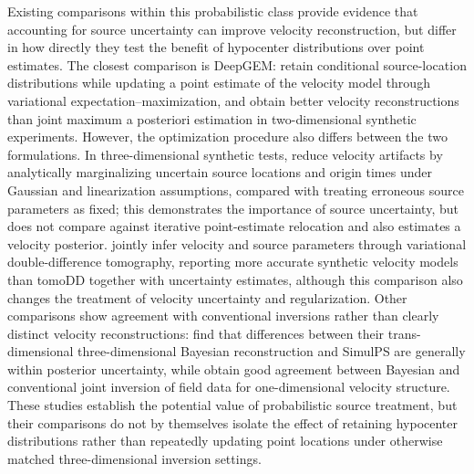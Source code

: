 \documentclass[12pt, a4paper]{article}
\begin{document}
Existing comparisons within this probabilistic class provide evidence that accounting for source uncertainty can improve velocity reconstruction, but differ in how directly they test the benefit of hypocenter distributions over point estimates. The closest comparison is DeepGEM: \textcite{gao2021} retain conditional source-location distributions while updating a point estimate of the velocity model through variational expectation--maximization, and obtain better velocity reconstructions than joint maximum a posteriori estimation in two-dimensional synthetic experiments. However, the optimization procedure also differs between the two formulations. In three-dimensional synthetic tests, \textcite{agata2026} reduce velocity artifacts by analytically marginalizing uncertain source locations and origin times under Gaussian and linearization assumptions, compared with treating erroneous source parameters as fixed; this demonstrates the importance of source uncertainty, but does not compare against iterative point-estimate relocation and also estimates a velocity posterior. \textcite{yang2025} jointly infer velocity and source parameters through variational double-difference tomography, reporting more accurate synthetic velocity models than tomoDD together with uncertainty estimates, although this comparison also changes the treatment of velocity uncertainty and regularization. Other comparisons show agreement with conventional inversions rather than clearly distinct velocity reconstructions: \textcite{pianaagostinetti2015} find that differences between their trans-dimensional three-dimensional Bayesian reconstruction and SimulPS are generally within posterior uncertainty, while \textcite{ryberg2019} obtain good agreement between Bayesian and conventional joint inversion of field data for one-dimensional velocity structure. These studies establish the potential value of probabilistic source treatment, but their comparisons do not by themselves isolate the effect of retaining hypocenter distributions rather than repeatedly updating point locations under otherwise matched three-dimensional inversion settings.
\end{document}
